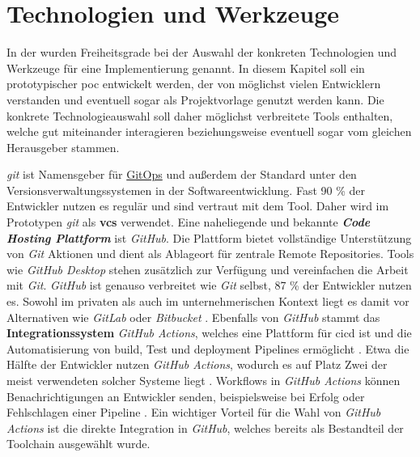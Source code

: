\section{Technologien und Werkzeuge}
\label{sec:06-01_technologies-and-tools}

In der  wurden Freiheitsgrade bei der Auswahl der konkreten Technologien und Werkzeuge für eine Implementierung genannt. In diesem Kapitel soll ein prototypischer \Gls{poc} entwickelt werden, der von möglichst vielen Entwicklern verstanden und eventuell sogar als Projektvorlage genutzt werden kann. Die konkrete Technologieauswahl soll daher möglichst verbreitete Tools enthalten, welche gut miteinander interagieren beziehungsweise eventuell sogar vom gleichen Herausgeber stammen.

\textit{\Gls{git}} ist Namensgeber für \hyperref[sec:03-03_gitops]{GitOps} und außerdem der Standard unter den Versionsverwaltungssystemen in der Softwareentwicklung. Fast 90 \% der Entwickler nutzen es regulär \cite{207:Developer-Ecosystem} und sind vertraut mit dem Tool. Daher wird im Prototypen \textit{\Gls{git}} als \textbf{\Gls{vcs}} verwendet. Eine naheliegende und bekannte \textbf{\textit{Code Hosting Plattform}} ist \textit{GitHub}. Die Plattform bietet vollständige Unterstützung von \textit{Git} Aktionen und dient als Ablageort für zentrale Remote Repositories. Tools wie \textit{GitHub Desktop} stehen zusätzlich zur Verfügung und vereinfachen die Arbeit mit \textit{Git}. \cite{301:About-GitHub-and-Git} \textit{GitHub} ist genauso verbreitet wie \textit{Git} selbst, 87 \% der Entwickler nutzen es. Sowohl im privaten als auch im unternehmerischen Kontext liegt es damit vor Alternativen wie \textit{GitLab} oder \textit{Bitbucket} \cite{207:Developer-Ecosystem}. Ebenfalls von \textit{GitHub} stammt das \textbf{Integrationssystem} \textit{GitHub Actions}, welches eine Plattform für \Gls{cicd} ist und die Automatisierung von \Gls{build}, Test und \Gls{deployment} Pipelines ermöglicht \cite{302:Understanding-GitHub-Actions}. Etwa die Hälfte der Entwickler nutzen \textit{GitHub Actions}, wodurch es auf Platz Zwei der meist verwendeten solcher Systeme liegt \cite{207:Developer-Ecosystem}. Workflows in \textit{GitHub Actions} können Benachrichtigungen an Entwickler senden, beispielsweise bei Erfolg oder Fehlschlagen einer Pipeline \cite{307:Notifications-for-Workflow-Runs}. Ein wichtiger Vorteil für die Wahl von \textit{GitHub Actions} ist die direkte Integration in \textit{GitHub}, welches bereits als Bestandteil der Toolchain ausgewählt wurde.

